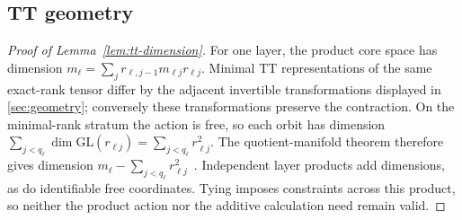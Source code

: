 \subsection{TT geometry}

\begin{proof}[Proof of Lemma~\ref{lem:tt-dimension}]
For one layer, the product core space has dimension
\(m_\ell=\sum_jr_{\ell,j-1}m_{\ell j}r_{\ell j}\). Minimal TT representations of the same exact-rank tensor differ by the adjacent invertible transformations displayed in \cref{sec:geometry}; conversely these transformations preserve the contraction. On the minimal-rank stratum the action is free, so each orbit has dimension
\(\sum_{j<q_\ell}\dim\mathrm{GL}(r_{\ell j})
=\sum_{j<q_\ell}r_{\ell j}^2\). The quotient-manifold theorem therefore gives dimension \(m_\ell-\sum_{j<q_\ell}r_{\ell j}^2\)~\citep{holtz2012manifolds}. Independent layer products add dimensions, as do identifiable free coordinates. Tying imposes constraints across this product, so neither the product action nor the additive calculation need remain valid.
\end{proof}

